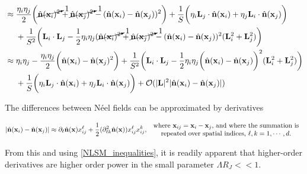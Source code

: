 \begin{equation}
    \begin{split}
        &\approx \frac{\eta_i \eta_j}{2} \bigg(\cancelto{1}{\hat{{\bf n}}({\bf x}_i)^2} + \cancelto{1}{\hat{{\bf n}}({\bf x}_j)^2} - (\hat{{\bf n}}({\bf x}_i) - \hat{{\bf n}}({\bf x}_j))^2\bigg) + \frac{1}{S} \bigg(\eta_i {\bf L}_j \cdot\hat{{\bf n}}({\bf x}_i) + \eta_j {\bf L}_i \cdot\hat{{\bf n}}({\bf x}_j) \bigg) \\
        & \textnormal{ } \textnormal{ } \textnormal{ } \textnormal{ } + \frac{1}{S^2} \bigg({\bf L}_i  \cdot {\bf L}_j - \frac{1}{2} \eta_i \eta_j (\cancelto{1}{\hat{{\bf n}}({\bf x}_i)^2} + \cancelto{1}{\hat{{\bf n}}({\bf x}_j)^2} - (\hat{{\bf n}}({\bf x}_i) - \hat{{\bf n}}({\bf x}_j))^2 ({\bf L}_i^2 + {\bf L}_j^2) \bigg) \\
        &\approx \eta_i \eta_j - \frac{\eta_i \eta_j}{2} \bigg(\hat{{\bf n}}({\bf x}_i) - \hat{{\bf n}}({\bf x}_j)^2\bigg) + \frac{1}{S^2} \bigg({\bf L}_i  \cdot {\bf L}_j - \frac{1}{2} \eta_i \eta_j \bigg(\hat{{\bf n}}({\bf x}_i) - \hat{{\bf n}}({\bf x}_j)\bigg)^2 ({\bf L}_i^2 + {\bf L}_j^2) \bigg) \\
        & \textnormal{ } \textnormal{ } \textnormal{ } \textnormal{ } + \frac{1}{S} \bigg(\eta_i {\bf L}_j \cdot\hat{{\bf n}}({\bf x}_i) + \eta_j {\bf L}_i \cdot\hat{{\bf n}}({\bf x}_j) \bigg) + \mathcal{O}(|{\bf L}|^2 |\hat{{\bf n}}({\bf x}_i)-\hat{{\bf n}}({\bf x}_j)|) 
    \end{split}
\end{equation}

The differences between Néel fields can be approximated by derivatives 

\begin{equation}
    |\hat{{\bf n}}({\bf x}_i)-\hat{{\bf n}}({\bf x}_j)| \approx \partial_{\ell} \hat{{\bf n}}({\bf x}) x_{ij}^{\ell} + \frac{1}{2} (\partial_{\ell k}^2 \hat{{\bf n}}({\bf x})) x_{ij}^{\ell} x_{ij}^{k}, \begin{array}{cc}
         \textnormal{ where ${\bf x}_{ij} = {\bf x}_i - {\bf x}_j $, and where the summation is}  \\
         \textnormal{  repeated over spatial indices, $\ell, k = 1, \cdots, d$.}
    \end{array}
\end{equation}

From this and using \cref{NLSM_inequalities}, it is readily apparent that higher-order derivatives are higher order power in the small parameter $\Lambda R_J << 1$. \\

